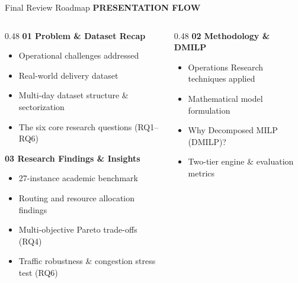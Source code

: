 \documentclass[aspectratio=169,10pt]{beamer}
\newcommand{\sectiontag}[1]{%
    {\scriptsize\bfseries\color{Accent}\MakeUppercase{#1}}\par\vspace{0.08cm}
}
\begin{document}
\begin{frame}{Final Review Roadmap}
\sectiontag{Presentation Flow}


\vspace{0.1cm}

\begin{columns}[T,totalwidth=\textwidth]
    \begin{column}{0.48\textwidth}
        \textbf{\normalsize\color{Primary} 01 \quad Problem \& Dataset Recap}
        \vspace{0.08cm}

        \begin{itemize}
            \setlength{\itemsep}{2pt}
            \item Operational challenges addressed
            \item Real-world delivery dataset
            \item Multi-day dataset structure \& sectorization
            \item The six core research questions (RQ1--RQ6)
        \end{itemize}

        \vspace{0.25cm}
        \textbf{\normalsize\color{Primary} 03 \quad Research Findings \& Insights}
        \vspace{0.08cm}

        \begin{itemize}
            \setlength{\itemsep}{2pt}
            \item 27-instance academic benchmark
            \item Routing and resource allocation findings
            \item Multi-objective Pareto trade-offs (RQ4)
            \item Traffic robustness \& congestion stress test (RQ6)
        \end{itemize}
    \end{column}

    \begin{column}{0.48\textwidth}
        \textbf{\normalsize\color{Primary} 02 \quad Methodology \& DMILP}
        \vspace{0.08cm}

        \begin{itemize}
            \setlength{\itemsep}{2pt}
            \item Operations Research techniques applied
            \item Mathematical model formulation
            \item Why Decomposed MILP (DMILP)?
            \item Two-tier engine \& evaluation metrics
        \end{itemize}


\end{column}
\end{columns}
\end{frame}
\end{document}
